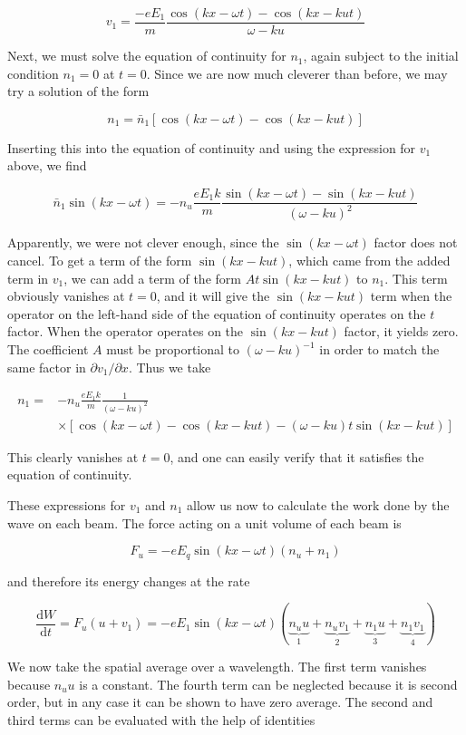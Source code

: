 \documentclass[
  notoc %
]{tufte-book}
\begin{document}
\[
v_1 = \frac{-eE_1}{m}\frac{\cos(kx-\omega t) - \cos(kx-kut)}{\omega-ku}
\]

Next, we must solve the equation of continuity for \(n_1\), again
subject to the initial condition \(n_1=0\) at \(t=0\). Since we are now
much cleverer than before, we may try a solution of the form

\[
n_1 = \bar{n}_1[\cos(kx-\omega t) - \cos(kx-kut)]
\]

Inserting this into the equation of continuity and using the expression
for \(v_1\) above, we find

\[
\bar{n}_1 \sin(kx-\omega t) = -n_u\frac{eE_1 k}{m}\frac{\sin(kx-\omega t) - \sin(kx-kut)}{(\omega - ku)^2}
\]

Apparently, we were not clever enough, since the \(\sin(kx-\omega t)\)
factor does not cancel. To get a term of the form \(\sin(kx-kut)\),
which came from the added term in \(v_1\), we can add a term of the form
\(At\sin(kx-kut)\) to \(n_1\). This term obviously vanishes at \(t=0\),
and it will give the \(\sin(kx-kut)\) term when the operator on the
left-hand side of the equation of continuity operates on the \(t\)
factor. When the operator operates on the \(\sin(kx-kut)\) factor, it
yields zero. The coefficient \(A\) must be proportional to
\((\omega-ku)^{-1}\) in order to match the same factor in
\(\partial v_1/\partial x\). Thus we take

\[
\begin{aligned}
n_1 =& -n_u\frac{eE_1 k}{m}\frac{1}{(\omega-ku)^2} \\
&\times[\cos(kx-\omega t) - \cos(kx-kut) - (\omega - ku)t\sin(kx-kut)]
\end{aligned}
\]

This clearly vanishes at \(t=0\), and one can easily verify that it
satisfies the equation of continuity.

These expressions for \(v_1\) and \(n_1\) allow us now to calculate the
work done by the wave on each beam. The force acting on a unit volume of
each beam is

\[
F_u = -eE_q\sin(kx-\omega t)(n_u+n_1)
\]

and therefore its energy changes at the rate

\[
\frac{\mathrm{d}W}{\mathrm{d}t} = F_u(u+v_1) = -eE_1\sin(kx-\omega t)(\underbrace{n_u u}_{1} +\underbrace{n_uv_1}_{2} + \underbrace{n_1 u}_{3} + \underbrace{n_1 v_1}_{4})
\]

We now take the spatial average over a wavelength. The first term
vanishes because \(n_u u\) is a constant. The fourth term can be
neglected because it is second order, but in any case it can be shown to
have zero average. The second and third terms can be evaluated with the
help of identities
\end{document}
